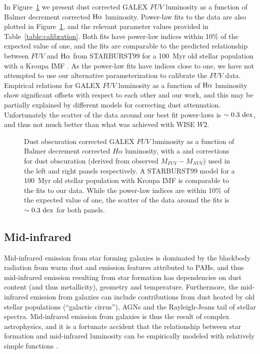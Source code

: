 \documentclass[preprint]{aastex61}
\begin{document}
In Figure~\ref{fig:fcal} we present dust corrected GALEX $FUV$ luminosity as a function of Balmer decrement corrected ${\rm H\alpha}$ luminosity. Power-law fits to the data are also plotted in Figure~\ref{fig:fcal}, and the relevant parameter values provided in Table~\ref{table:calibration}. Both fits have power-law indices within 10\% of the expected value of one, and the fits are comparable to the predicted relationship between $FUV$ and ${\rm H\alpha}$ from STARBURST99 \citep{lei99} for a 100~Myr old stellar population with a Kroupa IMF \citep{hao11}. As the power-law fits have indices close to one, we have not attempted to use our alternative parameterization to calibrate the $FUV$ data. Empirical relations for GALEX $FUV$ luminosity as a function of ${\rm H\alpha}$ luminosity \citep{lee09,dav16,jai16} show significant offsets with respect to each other and our work, and this may be partially explained by different models for correcting dust attenuation. Unfortunately the scatter of the data around our best fit power-laws is $\sim 0.3~{\rm dex}$, and thus not much better than what was achieved with WISE $W2$. 

\begin{figure*}
\caption{Dust obscuration corrected GALEX $FUV$ luminosity as a function of Balmer decrement corrected $H\alpha$ luminosity, with a \citet{cal00} and \citet{hao11} corrections for dust obscuration (derived from observed $M_{FUV}-M_{NUV}$) used in the left and right panels respectively.  A STARBURST99 \citep{lei99} model for a 100~Myr old stellar population with Kroupa IMF \citep{hao11} is comparable to the fits to our data. While the power-law indices are within 10\% of the expected value of one, the scatter of the data around the fits is $\sim 0.3~{\rm dex}$ for both panels.}
\label{fig:fcal}
\end{figure*}

\subsection{Mid-infrared}

Mid-infrared emission from star forming galaxies is dominated by the blackbody radiation from warm dust and emission features attributed to PAHs, and thus mid-infrared emission resulting from star formation has dependencies on dust content (and thus metallicity), geometry and temperature. Furthermore, the mid-infrared emission from galaxies can include contributions from dust heated by old stellar populations (``galactic cirrus''), AGNs and the Rayleigh-Jeans tail of stellar spectra. Mid-infrared emission from galaxies is thus the result of complex astrophysics, and it is a fortunate accident that the relationship between star formation and mid-infrared luminosity can be empirically modeled with relatively simple functions \citep[e.g.,][]{wu05,ken09,cat15}.
\end{document}
